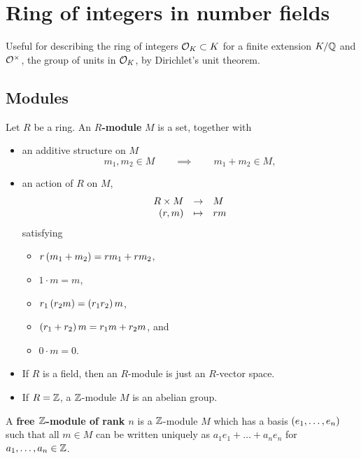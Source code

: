 \pagebreak

\section{Ring of integers in number fields}


Useful for describing the ring of integers $ \mathcal{O}_K \subset K $ for a finite extension $ K / \mathbb{Q} $ and $ \mathcal{O}^\times $, the group of units in $ \mathcal{O}_K $, by Dirichlet's unit theorem.

\subsection{Modules}

\begin{definition}
Let $ R $ be a ring. An \textbf{$ R $-module} $ M $ is a set, together with
\begin{itemize}
\item an additive structure on $ M $
$$ m_1, m_2 \in M \qquad \implies \qquad m_1 + m_2 \in M, $$
\item an action of $ R $ on $ M $,
$$ \function{R \times M}{M}{\rb{r, m}}{rm} $$
satisfying
\begin{itemize}
\item $ r\left( m_1 + m_2 \right) = rm_1 + rm_2 $,
\item $ 1 \cdot m = m $,
\item $ r_1\left( r_2m \right) = \left( r_1r_2 \right)m $,
\item $ \left( r_1 + r_2 \right)m = r_1m + r_2m $, and
\item $ 0 \cdot m = 0 $.
\end{itemize}
\end{itemize}
\end{definition}

\begin{note*}
\hfill
\begin{itemize}
\item If $ R $ is a field, then an $ R $-module is just an $ R $-vector space.
\item If $ R = \mathbb{Z} $, a $ \mathbb{Z} $-module $ M $ is an abelian group.
\end{itemize}
\end{note*}

\begin{definition}
A \textbf{free $ \mathbb{Z} $-module of rank $ n $} is a $ \mathbb{Z} $-module $ M $ which has a basis $ \left( e_1, \dots, e_n \right) $ such that all $ m \in M $ can be written uniquely as $ a_1e_1 + \dots + a_ne_n $ for $ a_1, \dots, a_n \in \mathbb{Z} $.
\end{definition}

